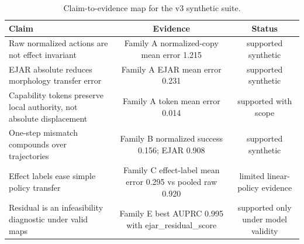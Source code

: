 \begin{table}[t]
\centering
\small
\caption{Claim-to-evidence map for the v3 synthetic suite.}
\label{tab:claim-evidence}
\begin{tabular}{lcc}
\toprule
Claim & Evidence & Status \\
\midrule
Raw normalized actions are not effect invariant & Family A normalized-copy mean error 1.215 & supported synthetic \\
EJAR absolute reduces morphology transfer error & Family A EJAR mean error 0.231 & supported synthetic \\
Capability tokens preserve local authority, not absolute displacement & Family A token mean error 0.014 & supported with scope \\
One-step mismatch compounds over trajectories & Family B normalized success 0.156; EJAR 0.908 & supported synthetic \\
Effect labels ease simple policy transfer & Family C effect-label mean error 0.295 vs pooled raw 0.920 & limited linear-policy evidence \\
Residual is an infeasibility diagnostic under valid maps & Family E best AUPRC 0.995 with ejar\_residual\_score & supported only under model validity \\
\bottomrule
\end{tabular}
\end{table}
